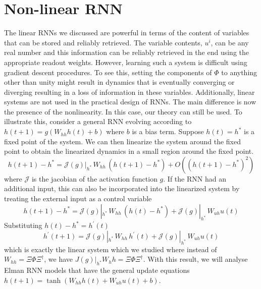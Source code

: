 \documentclass[11pt]{article}
\theoremstyle{definition}
\begin{document}
\section{Non-linear RNN}

The linear RNNs we discussed are powerful in terms of the content of variables that can be stored and reliably retrieved. The variable contents, $u^i$, can be any real number and this information can be reliably retrieved in the end using the appropriate readout weights.
%
However, learning such a system is difficult using gradient descent procedures. To see this, setting the components of $\Phi$ to anything other than unity might result in dynamics that is eventually converging or diverging resulting in a loss of information in these variables.
%
Additionally, linear systems are not used in the practical design of RNNs. The main difference is now the presence of the nonlinearity. In this case, our theory can still be used. 
%
To illustrate this, consider a general RNN evolving according to $h(t+1) = g(W_{hh} h(t) + b)$ where $b$ is a bias term. Suppose $h(t) = h^*$ is a fixed point of the system. We can then linearize the system around the fixed point to obtain the linearized dynamics in a small region around the fixed point. 
%
\begin{dmath}
    h(t+1) - h^* = \mathcal{J}(g)|_{h^*} \, W_{hh} \, (h(t+1) - h^*) + O((h(t+1) - h^*)^2)
\end{dmath}
%
where $\mathcal{J}$ is the jacobian of the activation function $g$. If the RNN had an additional input, this can also be incorporated into the linearized system by treating the external input as a control variable
%
\begin{dmath}
    h(t+1) - h^* = \mathcal{J}(g)|_{h^*} \, W_{hh} \, (h(t) - h^*) + \mathcal{J}(g)|_{h^*} \, W_{uh} u(t)
\end{dmath}
%
Substituting $h(t) - h^* = h^{\prime}(t)$
%
\begin{dmath}
    h^{\prime}(t+1) = \mathcal{J}(g)|_{h^*} \, W_{hh} \, h^{\prime}(t) + \mathcal{J}(g)|_{h^*} \, W_{uh} u(t)
\end{dmath}
%
which is exactly the linear system which we studied where instead of $W_{hh} = \Xi \Phi \Xi^\dag$, we have $J(g)|_{h^*} W_hh = \Xi \Phi \Xi^\dag$. With this result, we will analyse Elman RNN models that have the general update equations $h(t+1) = \tanh(W_{hh} h(t) + W_{uh} u(t) + b)$.
\end{document}

